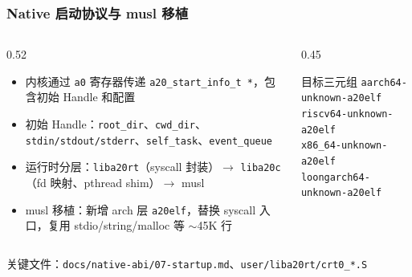 \documentclass[aspectratio=1610]{beamer}
\newcommand{\code}[1]{\texttt{\footnotesize #1}}
\begin{document}
\begin{frame}
    \frametitle{Native 启动协议与 musl 移植}
    \begin{columns}
        \begin{column}{0.52\textwidth}
            \footnotesize
            \begin{itemize}
                \item 内核通过 \code{a0} 寄存器传递 \code{a20\_start\_info\_t *}，包含初始 Handle 和配置
                \item 初始 Handle：\code{root\_dir}、\code{cwd\_dir}、\code{stdin/stdout/stderr}、\code{self\_task}、\code{event\_queue}
                \item 运行时分层：\code{liba20rt}（syscall 封装）$\rightarrow$ \code{liba20c}（fd 映射、pthread shim）$\rightarrow$ musl
                \item musl 移植：新增 arch 层 \code{a20elf}，替换 syscall 入口，复用 stdio/string/malloc 等 $\sim$45K 行
            \end{itemize}
        \end{column}
        \begin{column}{0.45\textwidth}
            \footnotesize
            \begin{block}{目标三元组}
                \code{aarch64-unknown-a20elf}\\
                \code{riscv64-unknown-a20elf}\\
                \code{x86\_64-unknown-a20elf}\\
                \code{loongarch64-unknown-a20elf}
            \end{block}
        \end{column}
    \end{columns}
    \vspace{0.3em}
    \small 关键文件：\code{docs/native-abi/07-startup.md}、\code{user/liba20rt/crt0\_*.S}
\end{frame}
\end{document}
